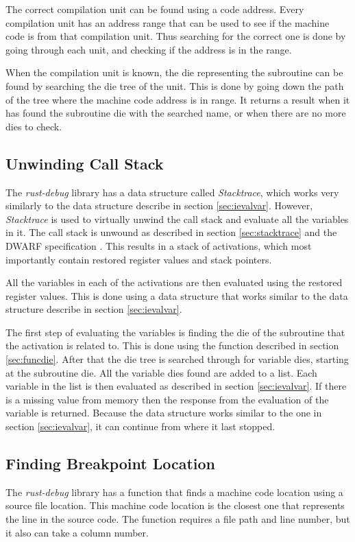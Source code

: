 The correct compilation unit can be found using a code address.
Every compilation unit has an address range that can be used to see if the machine code is from that compilation unit.
Thus searching for the correct one is done by going through each unit, and checking if the address is in the range.


When the compilation unit is known, the \gls{die} representing the subroutine can be found by searching the \gls{die} tree of the unit.
This is done by going down the path of the tree where the machine code address is in range.
It returns a result when it has found the subroutine \gls{die} with the searched name, or when there are no more \glspl{die} to check.


\subsection{Unwinding Call Stack}
The \emph{rust-debug} library has a data structure called \emph{Stacktrace}, which works very similarly to the data structure describe in section \ref{sec:ievalvar}.
However, \emph{Stacktrace} is used to virtually unwind the call stack and evaluate all the variables in it.
The call stack is unwound as described in section \ref{sec:stacktrace} and the \gls{DWARF} specification \cite{dwarf}.
This results in a stack of activations, which most importantly contain restored register values and stack pointers.


All the variables in each of the activations are then evaluated using the restored register values.
This is done using a data structure that works similar to the data structure describe in section \ref{sec:ievalvar}.

The first step of evaluating the variables is finding the \gls{die} of the subroutine that the activation is related to.
This is done using the function described in section \ref{sec:funcdie}.
After that the \gls{die} tree is searched through for variable \glspl{die}, starting at the subroutine \gls{die}.
All the variable \glspl{die} found are added to a list.
Each variable in the list is then evaluated as described in section \ref{sec:ievalvar}.
If there is a missing value from memory then the response from the evaluation of the variable is returned.
Because the data structure works similar to the one in section \ref{sec:ievalvar}, it can continue from where it last stopped.


\subsection{Finding Breakpoint Location}
The \emph{rust-debug} library has a function that finds a machine code location using a source file location.
This machine code location is the closest one that represents the line in the source code.
The function requires a file path and line number, but it also can take a column number.


